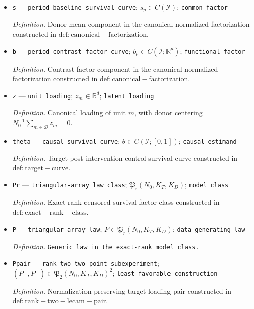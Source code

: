 \documentclass{article}
\begin{document}
\begin{itemize}
  \par\smallskip\noindent\emph{Definition.} Hazard corresponding to \(S^0_{p,m}\) on \(\mathcal I\).
  \item \texttt{s} --- \texttt{period baseline survival curve}; \(s_p\in C(\mathcal I)\); \texttt{common factor}
  \par\smallskip\noindent\emph{Definition.} Donor-mean component in the canonical normalized factorization constructed in \(\mathrm{def:canonical-factorization}\).
  \item \texttt{b} --- \texttt{period contrast-\allowbreak{}factor curve}; \(b_p\in C(\mathcal I;\mathbb R^d)\); \texttt{functional factor}
  \par\smallskip\noindent\emph{Definition.} Contrast-factor component in the canonical normalized factorization constructed in \(\mathrm{def:canonical-factorization}\).
  \item \texttt{z} --- \texttt{unit loading}; \(z_m\in\mathbb R^d\); \texttt{latent loading}
  \par\smallskip\noindent\emph{Definition.} Canonical loading of unit \(m\), with donor centering \(N_0^{-1}\sum_{m\in\mathcal D}z_m=0\).
  \item \texttt{theta} --- \texttt{causal survival curve}; \(\theta\in C(\mathcal I;[0,1])\); \texttt{causal estimand}
  \par\smallskip\noindent\emph{Definition.} Target post-intervention control survival curve constructed in \(\mathrm{def:target-curve}\).
  \item \texttt{Pr} --- \texttt{triangular-\allowbreak{}array law class}; \(\mathfrak P_r(N_0,K_T,K_D)\); \texttt{model class}
  \par\smallskip\noindent\emph{Definition.} Exact-rank censored survival-factor class constructed in \(\mathrm{def:exact-rank-class}\).
  \item \texttt{P} --- \texttt{triangular-\allowbreak{}array law}; \(P\in\mathfrak P_r(N_0,K_T,K_D)\); \texttt{data-\allowbreak{}generating law}
  \par\smallskip\noindent\emph{Definition.} \texttt{Generic law in the exact-\allowbreak{}rank model class.}
  \item \texttt{Ppair} --- \texttt{rank-\allowbreak{}two two-\allowbreak{}point subexperiment}; \((P_{-},P_{+})\in\mathfrak P_2(N_0,K_T,K_D)^2\); \texttt{least-\allowbreak{}favorable construction}
  \par\smallskip\noindent\emph{Definition.} Normalization-preserving target-loading pair constructed in \(\mathrm{def:rank-two-lecam-pair}\).

\end{itemize}
\end{document}
